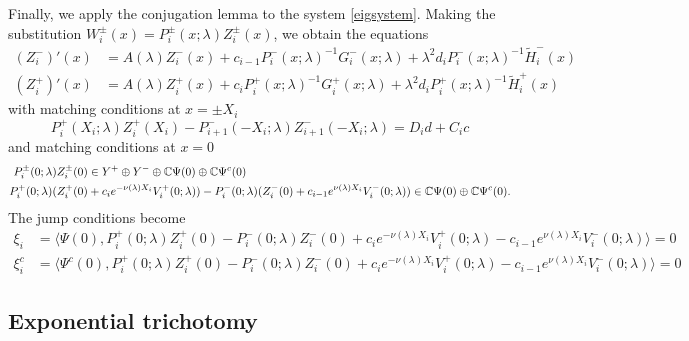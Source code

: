 \documentclass[10pt,reqno]{amsart}
\theoremstyle{plain}
\theoremstyle{definition}
\theoremstyle{remark}
\numberwithin{theorem}{section}
\numberwithin{equation}{section}
\begin{document}
Finally, we apply the conjugation lemma to the system \cref{eigsystem}. Making the substitution $W_i^\pm(x) = P_i^\pm(x; \lambda) Z_i^\pm(x)$, we obtain the equations
\begin{equation}\label{systemZ}
\begin{aligned}
(Z_i^-)'(x) &= A(\lambda) Z_i^-(x) + c_{i-1} P_i^-(x; \lambda)^{-1} G_i^-(x; \lambda) + \lambda^2 d_i P_i^-(x; \lambda)^{-1} \tilde{H}_i^-(x) \\
(Z_i^+)'(x) &= A(\lambda) Z_i^+(x) + c_i P_i^+(x; \lambda)^{-1} G_i^+(x; \lambda) + \lambda^2 d_i P_i^+(x; \lambda)^{-1} \tilde{H}_i^+(x)
\end{aligned}
\end{equation}
with matching conditions at $x = \pm X_i$
\begin{equation}\label{systemmiddle}
P_i^+(X_i; \lambda) Z_i^+(X_i) - P_{i+1}^-(-X_i; \lambda) Z_{i+1}^-(-X_i; \lambda) = D_i d + C_i c 
\end{equation}
and matching conditions at $x = 0$
\begin{align}
P_i^\pm(0; \lambda) Z_i^\pm(0) &\in Y^+ \oplus Y^- \oplus \mathbb{C} \Psi(0) \oplus \mathbb{C} \Psi^c(0) \label{systemcenter1} \\
P_i^+(0; \lambda)(Z_i^+(0) &+ c_i e^{-\nu(\lambda)X_i}V_i^+(0; \lambda)) - P_i^-(0; \lambda) (Z_i^-(0) + c_{i-1} e^{\nu(\lambda)X_i} V_i^-(0; \lambda)) \in \mathbb{C} \Psi(0) \oplus \mathbb{C} \Psi^c(0) \label{systemcenter2}.
\end{align}
The jump conditions become
\begin{equation}\label{jumpcondZ}
\begin{aligned}
\xi_i &= \langle \Psi(0), P_i^+(0; \lambda) Z_i^+(0) - P_i^-(0; \lambda) Z_i^-(0) + c_i e^{-\nu(\lambda)X_i}V_i^+(0; \lambda) - c_{i-1} e^{\nu(\lambda)X_i} V_i^-(0; \lambda) \rangle = 0  \\
\xi_i^c &= \langle \Psi^c(0), P_i^+(0; \lambda) Z_i^+(0) - P_i^-(0; \lambda) Z_i^-(0) + c_i e^{-\nu(\lambda)X_i}V_i^+(0; \lambda) - c_{i-1} e^{\nu(\lambda)X_i} V_i^-(0; \lambda) \rangle = 0 
\end{aligned}
\end{equation}

\subsection{Exponential trichotomy}\label{sec:trichotomy}
\end{document}
